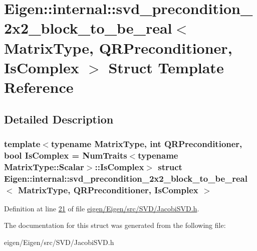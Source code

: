 \hypertarget{struct_eigen_1_1internal_1_1svd__precondition__2x2__block__to__be__real}{}\section{Eigen\+:\+:internal\+:\+:svd\+\_\+precondition\+\_\+2x2\+\_\+block\+\_\+to\+\_\+be\+\_\+real$<$ Matrix\+Type, Q\+R\+Preconditioner, Is\+Complex $>$ Struct Template Reference}
\label{struct_eigen_1_1internal_1_1svd__precondition__2x2__block__to__be__real}


\subsection{Detailed Description}
\subsubsection*{template$<$typename Matrix\+Type, int Q\+R\+Preconditioner, bool Is\+Complex = Num\+Traits$<$typename Matrix\+Type\+::\+Scalar$>$\+::\+Is\+Complex$>$\newline
struct Eigen\+::internal\+::svd\+\_\+precondition\+\_\+2x2\+\_\+block\+\_\+to\+\_\+be\+\_\+real$<$ Matrix\+Type, Q\+R\+Preconditioner, Is\+Complex $>$}



Definition at line \hyperlink{eigen_2_eigen_2src_2_s_v_d_2_jacobi_s_v_d_8h_source_l00021}{21} of file \hyperlink{eigen_2_eigen_2src_2_s_v_d_2_jacobi_s_v_d_8h_source}{eigen/\+Eigen/src/\+S\+V\+D/\+Jacobi\+S\+V\+D.\+h}.



The documentation for this struct was generated from the following file\+:\begin{DoxyCompactItemize}
\item 
eigen/\+Eigen/src/\+S\+V\+D/\+Jacobi\+S\+V\+D.\+h\end{DoxyCompactItemize}
